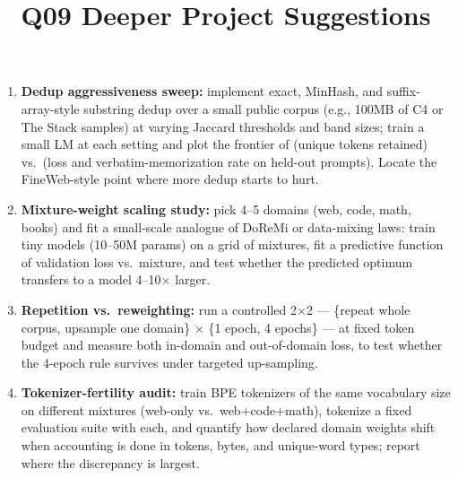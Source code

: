 \documentclass[11pt]{article}
\title{Q09 Deeper Project Suggestions}
\date{}
\begin{document}
\maketitle
\begin{enumerate}[noitemsep]
\item \textbf{Dedup aggressiveness sweep:} implement exact, MinHash, and suffix-array-style substring dedup over a small public corpus (e.g., 100MB of C4 or The Stack samples) at varying Jaccard thresholds and band sizes; train a small LM at each setting and plot the frontier of (unique tokens retained) vs.\ (loss and verbatim-memorization rate on held-out prompts). Locate the FineWeb-style point where more dedup starts to hurt.
\item \textbf{Mixture-weight scaling study:} pick 4--5 domains (web, code, math, books) and fit a small-scale analogue of DoReMi or data-mixing laws: train tiny models (10--50M params) on a grid of mixtures, fit a predictive function of validation loss vs.\ mixture, and test whether the predicted optimum transfers to a model 4--10$\times$ larger.
\item \textbf{Repetition vs.\ reweighting:} run a controlled 2$\times$2 --- \{repeat whole corpus, upsample one domain\} $\times$ \{1 epoch, 4 epochs\} --- at fixed token budget and measure both in-domain and out-of-domain loss, to test whether the 4-epoch rule survives under targeted up-sampling.
\item \textbf{Tokenizer-fertility audit:} train BPE tokenizers of the same vocabulary size on different mixtures (web-only vs.\ web+code+math), tokenize a fixed evaluation suite with each, and quantify how declared domain weights shift when accounting is done in tokens, bytes, and unique-word types; report where the discrepancy is largest.
\end{enumerate}
\end{document}

